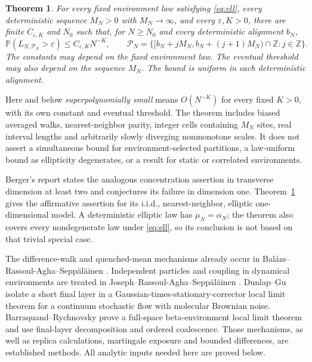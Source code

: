 \documentclass[11pt]{article}
\newtheorem{theorem}{Theorem}
\newcommand{\PP}{\mathbb P}
\newcommand{\ZZ}{\mathbb Z}
\newcommand{\cP}{\mathcal P}
\begin{document}
\begin{theorem}\label{thm:main}
For every fixed environment law satisfying \eqref{eq:ell}, every
deterministic sequence $M_N>0$ with $M_N\to\infty$, and every
$\varepsilon,K>0$, there are finite $C_{\varepsilon,K}$ and $N_0$
such that, for $N\geq N_0$ and every deterministic alignment $b_N$,
\begin{equation}\label{eq:main}
       \PP(L_{N,\cP_N}>\varepsilon)
                    \leq C_{\varepsilon,K}N^{-K},
 \qquad
 \cP_N=\{[b_N+jM_N,b_N+(j+1)M_N)\cap\ZZ:j\in\ZZ\}.
\end{equation}
The constants may depend on the fixed environment law.
The eventual threshold may also depend on the sequence $M_N$.
The bound is uniform in each deterministic alignment.
\end{theorem}

Here and below \emph{superpolynomially small} means $O(N^{-K})$ for
every fixed $K>0$, with its own constant and eventual threshold.
The theorem includes biased averaged walks, nearest-neighbor parity,
integer cells containing $M_N$ sites, real interval lengths and
arbitrarily slowly diverging nonmonotone scales.
It does not assert a simultaneous bound for environment-selected
partitions, a law-uniform bound as ellipticity degenerates, or a
result for static or correlated environments.

Berger's report \cite[pp.~2151--2152, Theorem~1 and Conjecture~1]{Berger}
states the analogous concentration assertion in transverse dimension
at least two and conjectures its failure in dimension one.
Theorem~\ref{thm:main} gives the affirmative assertion for its i.i.d.,
nearest-neighbor, elliptic one-dimensional model. A deterministic
elliptic law has $\mu_N=\alpha_N$; the theorem also covers every
nondegenerate law under \eqref{eq:ell}, so its conclusion is not based
on that trivial special case.

The difference-walk and quenched-mean mechanisms already occur in
Bal\'azs--Rassoul-Agha--Sepp\"al\"ainen \cite{BRAS}.
Independent particles and coupling in dynamical environments are
treated in Joseph--Rassoul-Agha--Sepp\"al\"ainen \cite{JRAS}.
Dunlap--Gu \cite{DG} isolate a short final layer in a
Gaussian-times-stationary-corrector local limit theorem for a continuum
stochastic flow with molecular Brownian noise.
Barraquand--Rychnovsky \cite[Section~1.4, Proposition~1.13 and
Section~4.5]{BR} prove a full-space beta-environment local limit
theorem and use final-layer decomposition and ordered coalescence.
Those mechanisms, as well as replica calculations, martingale exposure
and bounded differences, are established methods. All analytic inputs
needed here are proved below.
\end{document}
